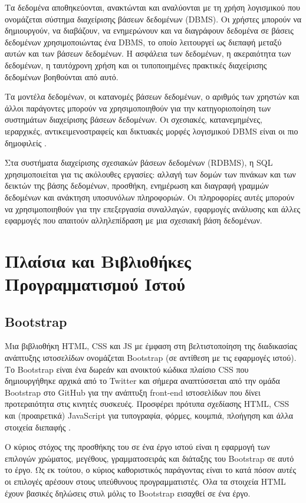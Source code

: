 Τα δεδομένα αποθηκεύονται, ανακτώνται και αναλύονται με τη χρήση λογισμικού που ονομάζεται σύστημα διαχείρισης βάσεων δεδομένων (DBMS). Οι χρήστες μπορούν να δημιουργούν, να διαβάζουν, να ενημερώνουν και να διαγράφουν δεδομένα σε βάσεις δεδομένων χρησιμοποιώντας ένα DBMS, το οποίο λειτουργεί ως διεπαφή μεταξύ αυτών και των βάσεων δεδομένων. Η ασφάλεια των δεδομένων, η ακεραιότητα των δεδομένων, η ταυτόχρονη χρήση και οι τυποποιημένες πρακτικές διαχείρισης δεδομένων βοηθούνται από αυτό.

Τα μοντέλα δεδομένων, οι κατανομές βάσεων δεδομένων, ο αριθμός των χρηστών και άλλοι παράγοντες μπορούν να χρησιμοποιηθούν για την κατηγοριοποίηση των συστημάτων διαχείρισης βάσεων δεδομένων. Οι σχεσιακές, κατανεμημένες, ιεραρχικές, αντικειμενοστραφείς και δικτυακές μορφές λογισμικού DBMS είναι οι πιο δημοφιλείς \cite{DBMS}.

Στα συστήματα διαχείρισης σχεσιακών βάσεων δεδομένων (RDBMS), η SQL χρησιμοποιείται για τις ακόλουθες εργασίες: αλλαγή των δομών των πινάκων και των δεικτών της βάσης δεδομένων, προσθήκη, ενημέρωση και διαγραφή γραμμών δεδομένων και ανάκτηση υποσυνόλων πληροφοριών. Οι πληροφορίες αυτές μπορούν να χρησιμοποιηθούν για την επεξεργασία συναλλαγών, εφαρμογές ανάλυσης και άλλες εφαρμογές που απαιτούν αλληλεπίδραση με μια σχεσιακή βάση δεδομένων.

\section{Πλαίσια και Βιβλιοθήκες Προγραμματισμού Ιστού}

\subsection{Bootstrap}
Μια βιβλιοθήκη HTML, CSS και JS με έμφαση στη βελτιστοποίηση της διαδικασίας ανάπτυξης ιστοσελίδων ονομάζεται Bootstrap (σε αντίθεση με τις εφαρμογές ιστού). Το Bootstrap είναι ένα δωρεάν και ανοικτού κώδικα πλαίσιο CSS που δημιουργήθηκε αρχικά από το Twitter και σήμερα αναπτύσσεται από την ομάδα Bootstrap στο GitHub για την ανάπτυξη front-end ιστοσελίδων που δίνει προτεραιότητα στις κινητές συσκευές. Προσφέρει πρότυπα σχεδίασης HTML, CSS και (προαιρετικά) JavaScript για τυπογραφία, φόρμες, κουμπιά, πλοήγηση και άλλα στοιχεία διεπαφής \cite{Bootstrap}. 

Ο κύριος στόχος της προσθήκης του σε ένα έργο ιστού είναι η εφαρμογή των επιλογών χρώματος, μεγέθους, γραμματοσειράς και διάταξης του Bootstrap σε αυτό το έργο. Ως εκ τούτου, ο κύριος καθοριστικός παράγοντας είναι το κατά πόσον αυτές οι επιλογές αρέσουν στους υπεύθυνους προγραμματιστές. Όλα τα στοιχεία HTML έχουν βασικές δηλώσεις στυλ μόλις το Bootstrap εισαχθεί σε ένα έργο. 

